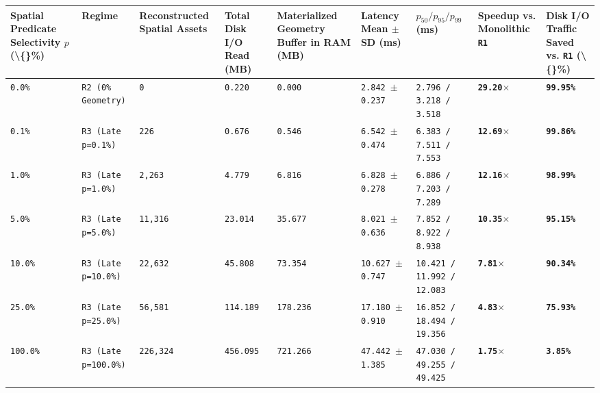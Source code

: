 \documentclass[10pt,a4paper]{article}
\begin{document}
{\scriptsize
\begin{longtable}{p{}p{}p{}p{}p{}p{}p{}p{}p{}}
\toprule
\textbf{Spatial Predicate Selectivity $p$ (\textbackslash\{\}\%)} & \textbf{Regime} & \textbf{Reconstructed Spatial Assets} & \textbf{Total Disk I/O Read (MB)} & \textbf{Materialized Geometry Buffer in RAM (MB)} & \textbf{Latency Mean $\pm$ SD (ms)} & \textbf{$p_{50} / p_{95} / p_{99}$ (ms)} & \textbf{Speedup vs. Monolithic \texttt{R1}} & \textbf{Disk I/O Traffic Saved vs. \texttt{R1} (\textbackslash\{\}\%)} \\
\midrule
\endhead
\texttt{0.0\%} & \texttt{R2 (0\% Geometry)} & \texttt{0} & \texttt{0.220} & \texttt{0.000} & \texttt{2.842 $\pm$ 0.237} & \texttt{2.796 / 3.218 / 3.518} & \textbf{\texttt{29.20$\times$}} & \textbf{\texttt{99.95\%}} \\
\texttt{0.1\%} & \texttt{R3 (Late p=0.1\%)} & \texttt{226} & \texttt{0.676} & \texttt{0.546} & \texttt{6.542 $\pm$ 0.474} & \texttt{6.383 / 7.511 / 7.553} & \textbf{\texttt{12.69$\times$}} & \textbf{\texttt{99.86\%}} \\
\texttt{1.0\%} & \texttt{R3 (Late p=1.0\%)} & \texttt{2,263} & \texttt{4.779} & \texttt{6.816} & \texttt{6.828 $\pm$ 0.278} & \texttt{6.886 / 7.203 / 7.289} & \textbf{\texttt{12.16$\times$}} & \textbf{\texttt{98.99\%}} \\
\texttt{5.0\%} & \texttt{R3 (Late p=5.0\%)} & \texttt{11,316} & \texttt{23.014} & \texttt{35.677} & \texttt{8.021 $\pm$ 0.636} & \texttt{7.852 / 8.922 / 8.938} & \textbf{\texttt{10.35$\times$}} & \textbf{\texttt{95.15\%}} \\
\texttt{10.0\%} & \texttt{R3 (Late p=10.0\%)} & \texttt{22,632} & \texttt{45.808} & \texttt{73.354} & \texttt{10.627 $\pm$ 0.747} & \texttt{10.421 / 11.992 / 12.083} & \textbf{\texttt{7.81$\times$}} & \textbf{\texttt{90.34\%}} \\
\texttt{25.0\%} & \texttt{R3 (Late p=25.0\%)} & \texttt{56,581} & \texttt{114.189} & \texttt{178.236} & \texttt{17.180 $\pm$ 0.910} & \texttt{16.852 / 18.494 / 19.356} & \textbf{\texttt{4.83$\times$}} & \textbf{\texttt{75.93\%}} \\
\texttt{100.0\%} & \texttt{R3 (Late p=100.0\%)} & \texttt{226,324} & \texttt{456.095} & \texttt{721.266} & \texttt{47.442 $\pm$ 1.385} & \texttt{47.030 / 49.255 / 49.425} & \textbf{\texttt{1.75$\times$}} & \textbf{\texttt{3.85\%}} \\
\bottomrule
\end{longtable}
}
\end{document}
